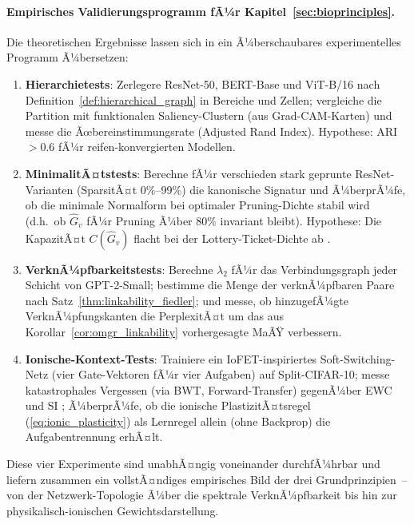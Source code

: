 ﻿\documentclass[12pt, a4paper, openany]{report}
\begin{document}
\paragraph{Empirisches Validierungsprogramm fÃ¼r Kapitel~\ref{sec:bioprinciples}.}
Die theoretischen Ergebnisse lassen sich in ein Ã¼berschaubares
experimentelles Programm Ã¼bersetzen:
\begin{enumerate}[label=(\alph*)]
  \item \textbf{Hierarchietests}: Zerlegere ResNet-50, BERT-Base und
    ViT-B/16 nach Definition~\ref{def:hierarchical_graph} in Bereiche und
    Zellen; vergleiche die Partition mit funktionalen Saliency-Clustern
    (aus Grad-CAM-Karten) und messe die Ãœbereinstimmungs\-rate
    (Adjusted Rand Index).  Hypothese: ARI $> 0.6$ fÃ¼r reifen-konvergierten
    Modellen.
  \item \textbf{MinimalitÃ¤tstests}: Berechne fÃ¼r verschieden stark geprunte
    ResNet-Varianten (SparsitÃ¤t 0\%--99\%) die kanonische Signatur und
    Ã¼berprÃ¼fe, ob die minimale Normal\-form bei optimaler Pruning-Dichte
    stabil wird (d.h.\ ob $\hat{G}_v$ fÃ¼r Pruning Ã¼ber 80\% invariant bleibt).
    Hypothese: Die KapazitÃ¤t $C(\hat{G}_v)$ flacht bei der Lottery-Ticket-Dichte
    ab \cite{frankle19}.
  \item \textbf{VerknÃ¼pfbarkeitstests}: Berechne $\lambda_2$ fÃ¼r das
    Verbindungsgraph jeder Schicht von GPT-2-Small; bestimme die Menge der
    verknÃ¼pfbaren Paare nach Satz~\ref{thm:linkability_fiedler}; und messe,
    ob hinzugefÃ¼gte VerknÃ¼pfungskanten die PerplexitÃ¤t um das aus
    Korollar~\ref{cor:omgr_linkability} vorhergesagte MaÃŸ verbessern.
  \item \textbf{Ionische-Kontext-Tests}: Trainiere ein
    IoFET-inspiriertes Soft-Switching-Netz (vier Gate-Vektoren fÃ¼r vier
    Aufgaben) auf Split-CIFAR-10; messe katastrophales Vergessen (via BWT,
    Forward-Transfer) gegenÃ¼ber EWC \cite{kirkpatrick17} und SI \cite{zenke17};
    Ã¼berprÃ¼fe, ob die ionische PlastizitÃ¤ts\-regel (\cref{eq:ionic_plasticity})
    als Lernregel allein (ohne Backprop) die Aufgaben\-trennung erhÃ¤lt.
\end{enumerate}
Diese vier Experimente sind unabhÃ¤ngig voneinander durchfÃ¼hrbar und liefern
zusammen ein vollstÃ¤ndiges empirisches Bild der drei Grundprinzipien~--
von der Netzwerk-Topologie Ã¼ber die spektrale VerknÃ¼pfbarkeit bis hin zur
physikalisch-ionischen Gewichtsdarstellung.
\end{document}
